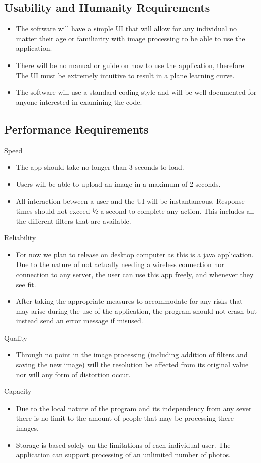 \documentclass[12pt, titlepage]{article}
\begin{document}
\subsection{Usability and Humanity Requirements}
\begin{itemize}
\item The software will have a simple UI that will allow for any individual no matter their age or familiarity with image processing to be able to use the application.
\item There will be no manual or guide on how to use the application, therefore The UI must be extremely intuitive to result in a plane learning curve.
\item The software will use a standard coding style and will be well documented for anyone interested in examining the code.
\end{itemize}

\subsection{Performance Requirements}
Speed
\begin{itemize}
\item The app should take no longer than 3 seconds to load.
\item Users will be able to upload an image in a maximum of 2 seconds.
\item All interaction between a user and the UI will be instantaneous. Response times should not exceed ½ a second to complete any action. This includes all the different filters that are available.
\end{itemize}
Reliability
\begin{itemize}
\item For now we plan to release on desktop computer as this is a java application. Due to the nature of not actually needing a wireless connection nor connection to any server, the user can use this app freely, and whenever they see fit.
\item After taking the appropriate measures to accommodate for any risks that may arise during the use of the application, the program should not crash but instead send an error message if misused.
\end{itemize}
Quality
\begin{itemize}
\item Through no point in the image processing (including addition of filters and saving the new image) will the resolution be affected from its original value nor will any form of distortion occur.
\end{itemize}
Capacity
\begin{itemize}
\item Due to the local nature of the program and its independency from any sever there is no limit to the amount of people that may be processing there images.
\item Storage is based solely on the limitations of each individual user. The application can support processing of an unlimited number of photos.
\end{itemize}
\end{document}
